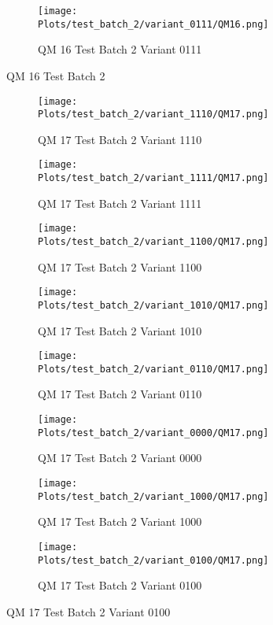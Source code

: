 \documentclass{DissertateFigs}
\begin{document}
\begin{figure}[t!]
\medskip

    \begin{subfigure}{0.33\textwidth}
    \texttt{[image: Plots/test\_batch\_2/variant\_0111/QM16.png]}
    \caption{QM 16 Test Batch 2 Variant 0111}
    \end{subfigure}
\caption{QM 16 Test Batch 2}
    \end{figure}
\clearpage
\begin{figure}[t!]
    \begin{subfigure}{0.43\textwidth}
    \texttt{[image: Plots/test\_batch\_2/variant\_1110/QM17.png]}
    \caption{QM 17 Test Batch 2 Variant 1110}
    \end{subfigure}
    \begin{subfigure}{0.43\textwidth}
    \texttt{[image: Plots/test\_batch\_2/variant\_1111/QM17.png]}
    \caption{QM 17 Test Batch 2 Variant 1111}
    \end{subfigure}

\medskip

    \begin{subfigure}{0.43\textwidth}
    \texttt{[image: Plots/test\_batch\_2/variant\_1100/QM17.png]}
    \caption{QM 17 Test Batch 2 Variant 1100}
    \end{subfigure}
    \begin{subfigure}{0.43\textwidth}
    \texttt{[image: Plots/test\_batch\_2/variant\_1010/QM17.png]}
    \caption{QM 17 Test Batch 2 Variant 1010}
    \end{subfigure}

\medskip

    \begin{subfigure}{0.43\textwidth}
    \texttt{[image: Plots/test\_batch\_2/variant\_0110/QM17.png]}
    \caption{QM 17 Test Batch 2 Variant 0110}
    \end{subfigure}
    \begin{subfigure}{0.43\textwidth}
    \texttt{[image: Plots/test\_batch\_2/variant\_0000/QM17.png]}
    \caption{QM 17 Test Batch 2 Variant 0000}
    \end{subfigure}

\medskip

    \begin{subfigure}{0.43\textwidth}
    \texttt{[image: Plots/test\_batch\_2/variant\_1000/QM17.png]}
    \caption{QM 17 Test Batch 2 Variant 1000}
    \end{subfigure}
    \begin{subfigure}{0.43\textwidth}
    \texttt{[image: Plots/test\_batch\_2/variant\_0100/QM17.png]}
    \caption{QM 17 Test Batch 2 Variant 0100}
    \end{subfigure}


\end{figure}
\end{document}
